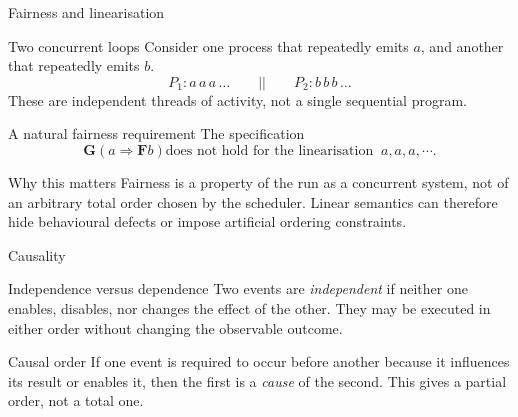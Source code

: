 \documentclass[t,11pt]{beamer}
\begin{document}
\begin{frame}{Fairness and linearisation}
  \begin{block}{Two concurrent loops}
    Consider one process that repeatedly emits $a$, and another that repeatedly emits $b$.
    \[
    P_1: a\,a\,a\,\ldots
    \qquad \text{||}\qquad
    P_2: b\,b\,b\,\ldots
    \]
    These are independent threads of activity, not a single sequential program.
  \end{block}
  \begin{block}{A natural fairness requirement}
    The specification 
    \[
    \mathbf{G}(a\Rightarrow \mathbf{F}b) \text{does not hold for the linearisation }\ a,a,a,\cdots.
    \]
    
   \end{block}
  \begin{block}{Why this matters}
    Fairness is a property of the run as a concurrent system, not of an arbitrary total order chosen by the scheduler. Linear semantics can therefore hide behavioural defects or impose artificial ordering constraints.
  \end{block}
\end{frame}


\begin{frame}{Causality}
  \begin{block}{Independence versus dependence}
    Two events are \emph{independent} if neither one enables, disables, nor changes the effect of the other. They may be executed in either order without changing the observable outcome.
  \end{block}
  \begin{block}{Causal order}
    If one event is required to occur before another because it influences its result or enables it, then the first is a \emph{cause} of the second. This gives a partial order, not a total one.
  \end{block}
  \begin{center}
  \end{center}
 
\end{frame}
\end{document}
